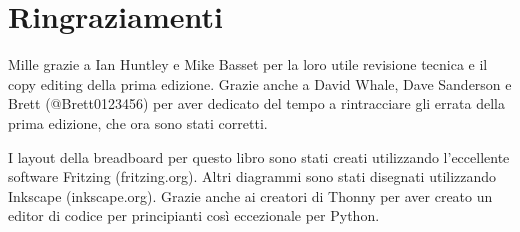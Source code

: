 \section*{Ringraziamenti}


Mille grazie a Ian Huntley e Mike Basset per la loro utile revisione tecnica e il copy editing della prima edizione. Grazie anche a David Whale, Dave Sanderson e Brett (@Brett0123456) per aver dedicato del tempo a rintracciare gli errata della prima edizione, che ora sono stati corretti.

I layout della breadboard per questo libro sono stati creati utilizzando l'eccellente software Fritzing (fritzing.org). Altri diagrammi sono stati disegnati utilizzando Inkscape (inkscape.org). Grazie anche ai creatori di Thonny per aver creato un editor di codice per principianti così eccezionale per Python.


\tableofcontents
